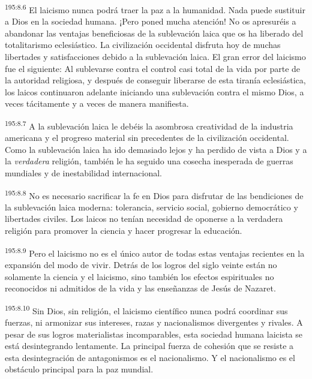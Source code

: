 \par 
\textsuperscript{195:8.6} El laicismo nunca podrá traer la paz a la humanidad. Nada puede sustituir a Dios en la sociedad humana. ¡Pero poned mucha atención! No os apresuréis a abandonar las ventajas beneficiosas de la sublevación laica que os ha liberado del totalitarismo eclesiástico. La civilización occidental disfruta hoy de muchas libertades y satisfacciones debido a la sublevación laica. El gran error del laicismo fue el siguiente: Al sublevarse contra el control casi total de la vida por parte de la autoridad religiosa, y después de conseguir liberarse de esta tiranía eclesiástica, los laicos continuaron adelante iniciando una sublevación contra el mismo Dios, a veces tácitamente y a veces de manera manifiesta.

\par 
\textsuperscript{195:8.7} A la sublevación laica le debéis la asombrosa creatividad de la industria americana y el progreso material sin precedentes de la civilización occidental. Como la sublevación laica ha ido demasiado lejos y ha perdido de vista a Dios y a la \textit{verdadera} religión, también le ha seguido una cosecha inesperada de guerras mundiales y de inestabilidad internacional.

\par 
\textsuperscript{195:8.8} No es necesario sacrificar la fe en Dios para disfrutar de las bendiciones de la sublevación laica moderna: tolerancia, servicio social, gobierno democrático y libertades civiles. Los laicos no tenían necesidad de oponerse a la verdadera religión para promover la ciencia y hacer progresar la educación.

\par 
\textsuperscript{195:8.9} Pero el laicismo no es el único autor de todas estas ventajas recientes en la expansión del modo de vivir. Detrás de los logros del siglo veinte están no solamente la ciencia y el laicismo, sino también los efectos espirituales no reconocidos ni admitidos de la vida y las enseñanzas de Jesús de Nazaret.

\par 
\textsuperscript{195:8.10} Sin Dios, sin religión, el laicismo científico nunca podrá coordinar sus fuerzas, ni armonizar sus intereses, razas y nacionalismos divergentes y rivales. A pesar de sus logros materialistas incomparables, esta sociedad humana laicista se está desintegrando lentamente. La principal fuerza de cohesión que se resiste a esta desintegración de antagonismos es el nacionalismo. Y el nacionalismo es el obstáculo principal para la paz mundial.

